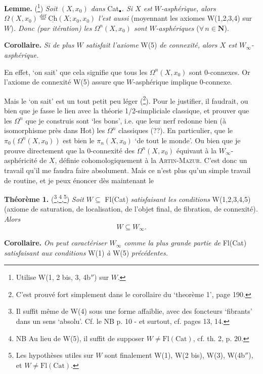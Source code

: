 \documentclass[11pt]{article}
\newcommand{\msp}[1]{\marginpar{\footnotesize [#1]}}
\newcommand{\Ch}{\underline{\mathrm{Ch}}}
\begin{document}
\msp{page 12}\textbf{Lemme.} (\footnote[24]{Utilise W(1, 2 bis, 3, 4b$''$) sur $W$.}) \textit{Soit $(X, x_0)$ dans} Cat$_\bullet$\textit{. Si $X$ est $W$-asphérique, alors $\Omega(X, x_0) \overset{\text{déf}}{=} \Ch(X; x_0, x_0)$ l'est aussi} (moyennant les axiomes W(1,2,3,4) sur $W$)\textit{. Donc (par itération) les $\Omega^n(X, x_0)$ sont $W$-asphériques} ($\forall\, n \in \mathbf{N}$).

\textbf{Corollaire.} \textit{Si de plus $W$ satisfait l'axiome} W(5) \textit{de connexité, alors $X$ est $W_\infty$-asphérique.}

En effet, `on sait' que cela signifie que tous les $\Omega^n(X, x_0)$ sont 0-connexes. Or l'axiome de connexité W(5) assure que $W$-asphérique implique 0-connexe.

Mais le `on sait' est un tout petit peu léger (\footnote[25]{C'est prouvé fort simplement dans le corollaire du `theorème 1', page 190.}). Pour le justifier, il faudrait, ou bien %
que je fasse le lien avec la théorie 1/2-simpliciale classique, et prouver que les $\Omega^n$ que je construis sont `les bons', i.e. que leur nerf redonne bien (à isomorphisme près dans Hot) les $\Omega^n$ classiques (??). En particulier, que le $\pi_0(\Omega^n(X, x_0))$ est bien le $\pi_n(X, x_0)$ `de tout le monde'. Ou bien que je prouve directement que la 0-connexité des $\Omega^n(X, x_0)$ équivaut à la $W_\infty$-asphéricité de $X$, définie cohomologiquement à la \textsc{Artin-Mazur}. C'est donc un travail qu'il me faudra faire absolument. Mais ce n'est plus qu'un simple travail de routine, et je peux énoncer dès maintenant le

\textbf{Théorème 1.} (\footnote[26]{Il suffit même de W(4) sous une forme affaiblie, avec des foncteurs `fibrants' dans un sens `absolu'. Cf. le NB p. 10 - et surtout, cf. pages 13, 14.},\footnote[27]{NB Au lieu de W(5), il suffit de supposer $W \neq \mathrm{Fl}(\mathrm{Cat})$, cf. th. 2, p. 20.},\footnote[28]{Les hypothèses utiles sur $W$ sont finalement W(1), W(2 bis), W(3), W(4b$''$), et $W \neq \mathrm{Fl}(\mathrm{Cat})$.}) \textit{Soit $W \subseteq$} Fl(Cat) \textit{satisfaisant les conditions} W(1,2,3,4,5) (axiome de saturation, de localisation, de l'objet final, de fibration, de connexité)\textit{. Alors}
\[ W \subseteq W_\infty . \]

\textbf{Corollaire.} \textit{On peut caractériser $W_\infty$ comme la plus grande partie de} Fl(Cat) \textit{satisfaisant aux}
\msp{page 13}\textit{conditions} W(1) \textit{à} W(5) \textit{précédentes.}
\end{document}
